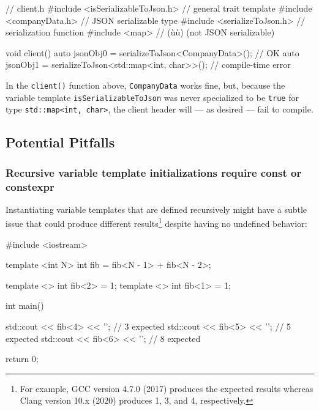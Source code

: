 \begin{emcppslisting}[language=C++]
// client.h
#include <isSerializableToJson.h>  // general trait template
#include <companyData.h>           // JSON serializable type
#include <serializeToJson.h>       // serialization function
#include <map>                     // (ù{}ù) (not JSON serializable)

void client()
{
    auto jsonObj0 = serializeToJson<CompanyData>();         // OK
    auto jsonObj1 = serializeToJson<std::map<int, char>>(); // compile-time error
}
\end{emcppslisting}
    
\noindent In the \lstinline!client()! function above, \lstinline!CompanyData! works
fine, but, because the variable template \lstinline!isSerializableToJson!
was never specialized to be \lstinline!true! for type
\mbox{\lstinline!std::map<int,! \lstinline!char>!}, the client header will --- as
desired --- fail to compile.

\subsection[Potential Pitfalls]{Potential Pitfalls}\label{variabletemplate-potential-pitfalls}

\subsubsection[Recursive variable template initializations require {\tt const} or {\tt constexpr}]{Recursive variable template initializations require {\SubsubsecCode const} or {\SubsubsecCode constexpr}}\label{recursive-variable-template-initializations-require-const-or-constexpr}

Instantiating variable templates that are defined recursively might have a subtle issue that could produce different results{\cprotect\footnote{For
example, GCC version 4.7.0 (2017) produces the expected results whereas
  Clang version 10.x (2020) produces 1, 3, and 4, respectively.}} despite having no undefined behavior:

\begin{emcppslisting}[language=C++]
#include <iostream>

template <int N>
int fib = fib<N - 1> + fib<N - 2>;

template <> int fib<2> = 1;
template <> int fib<1> = 1;

int main()
{
    std::cout << fib<4> << '\n';  // 3 expected
    std::cout << fib<5> << '\n';  // 5 expected
    std::cout << fib<6> << '\n';  // 8 expected

    return 0;
}
\end{emcppslisting}
    
